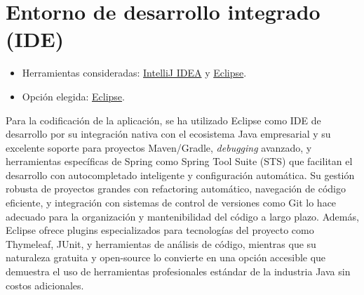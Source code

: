 \section{Entorno de desarrollo integrado (IDE)}\label{entorno-de-desarrollo-integrado}

\begin{itemize}
\tightlist
\item
  Herramientas consideradas: 
  \href{https://www.jetbrains.com/idea/}{IntelliJ IDEA} y
  \href{https://eclipse.org/}{Eclipse}.
\item
  Opción elegida: \href{https://eclipse.org/}{Eclipse}.
\end{itemize}

Para la codificación de la aplicación, se ha utilizado Eclipse como IDE de desarrollo por su integración nativa con el ecosistema Java empresarial y su excelente soporte para proyectos Maven/Gradle, \emph{debugging} avanzado, y herramientas específicas de Spring como Spring Tool Suite (STS) que facilitan el desarrollo con autocompletado inteligente y configuración automática. Su gestión robusta de proyectos grandes con refactoring automático, navegación de código eficiente, y integración con sistemas de control de versiones como Git lo hace adecuado para la organización y mantenibilidad del código a largo plazo. Además, Eclipse ofrece plugins especializados para tecnologías del proyecto como Thymeleaf, JUnit, y herramientas de análisis de código, mientras que su naturaleza gratuita y open-source lo convierte en una opción accesible que demuestra el uso de herramientas profesionales estándar de la industria Java sin costos adicionales.
